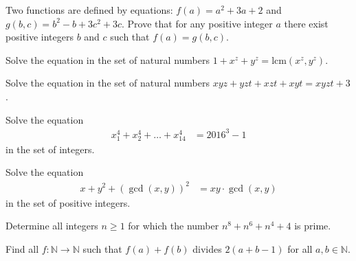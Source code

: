 \begin{problem}
	Two functions are defined by equations: $f(a) = a^2 + 3a + 2$ and $g(b, c) = b^2 - b + 3c^2 + 3c$. Prove that for any positive integer $a$ there exist positive integers $b$ and $c$ such that $f(a) = g(b, c)$. %
\end{problem}

\begin{problem}
	Solve the equation in the set of natural numbers $1+x^z + y^z = \text{lcm}(x^z,y^z)$. %
\end{problem}

\begin{problem}
	Solve the equation in the set of natural numbers $xyz+yzt+xzt+xyt = xyzt + 3$. %
\end{problem}

\begin{problem}
	Solve the equation
	\begin{align*}
		x_1^4 + x_2^4 + \dots + x_{14}^4 &= 2016^3 -1
	\end{align*}
	in the set of integers.
\end{problem}

\begin{problem}
	Solve the equation
	\begin{align*}
		x + y^2 + \left(\gcd(x,y)\right)^2 &= xy \cdot \gcd(x,y)
	\end{align*}
	in the set of positive integers.
\end{problem}

\begin{problem}
	Determine all integers $n\ge1$ for which the number $n^8+n^6+n^4+4$ is prime. %
\end{problem}

\begin{problem}
	Find all $f : \mathbb{N} \to \mathbb{N} $ such that $f(a) + f(b)$ divides $2(a + b - 1)$ for all $a, b \in \mathbb{N}$. %
\end{problem}


